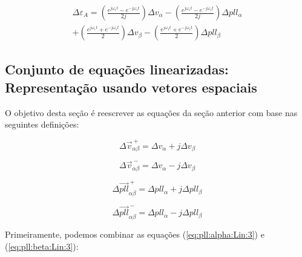 \documentclass[12pt,a4paper]{report}
\begin{document}
\begin{multline}
\Delta\varepsilon_A =
\left(
\frac{e^{j\omega_1 t} - e^{-j\omega_1 t}}{2j}
\right) 
\Delta v_\alpha 
- \left(
\frac{e^{j\omega_1 t} - e^{-j\omega_1 t}}{2j}
\right)
\Delta pll_\alpha \\
+ \left(
\frac{e^{j\omega_1 t} + e^{-j\omega_1 t}}{2}
\right) 
\Delta v_\beta 
- \left(
\frac{e^{j\omega_1 t} + e^{-j\omega_1 t}}{2}
\right) 
\Delta pll_\beta
\label{eq:erro:amp:Lin:3}
\end{multline}




\subsection{Conjunto de equações linearizadas: Representação usando vetores espaciais}

O objetivo desta seção é reescrever as equações da seção anterior com base nas seguintes definições:

\begin{equation}
\Delta \vec{v}_{\alpha\beta}^{~+}  = 
\Delta v_{\alpha} +
j \Delta v_{\beta}  
\end{equation}

\begin{equation}
\Delta \vec{v}_{\alpha\beta}^{~-}  = 
\Delta v_{\alpha} -
j \Delta v_{\beta}  
\end{equation}

\begin{equation}
\Delta \vec{pll}_{\alpha\beta}^{~+}  = 
\Delta pll_{\alpha} +
j \Delta pll_{\beta}  
\end{equation}


\begin{equation}
\Delta \vec{pll}_{\alpha\beta}^{~-}  = 
\Delta pll_{\alpha} -
j \Delta pll_{\beta}  
\end{equation}


Primeiramente, podemos combinar as equações (\ref{eq:pll:alpha:Lin:3}) e (\ref{eq:pll:beta:Lin:3}):
\end{document}
